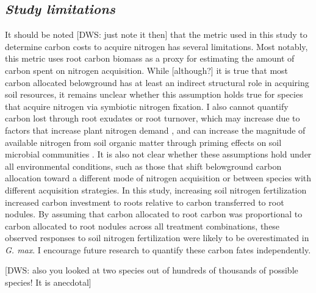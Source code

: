 \subsection{\textit{Study limitations}}
\noindent It should be noted [DWS: just note it then] that the metric used in this study to determine carbon costs to acquire nitrogen has several limitations. Most notably, this metric uses root carbon biomass as a proxy for estimating the amount of carbon spent on nitrogen acquisition. While [although?] it is true that most carbon allocated belowground has at least an indirect structural role in acquiring soil resources, it remains unclear whether this assumption holds true for species that acquire nitrogen via symbiotic nitrogen fixation. I also cannot quantify carbon lost through root exudates or root turnover, which may increase due to factors that increase plant nitrogen demand , and can increase the magnitude of available nitrogen from soil organic matter through priming effects on soil microbial communities . It is also not clear whether these assumptions hold under all environmental conditions, such as those that shift belowground carbon allocation toward a different mode of nitrogen acquisition  or between species with different acquisition strategies. In this study, increasing soil nitrogen fertilization increased carbon investment to roots relative to carbon transferred to root nodules. By assuming that carbon allocated to root carbon was proportional to carbon allocated to root nodules across all treatment combinations, these observed responses to soil nitrogen fertilization were likely to be overestimated in \textit{G. max}. I encourage future research to quantify these carbon fates independently.

[DWS: also you looked at two species out of hundreds of thousands of possible species! It is anecdotal]


